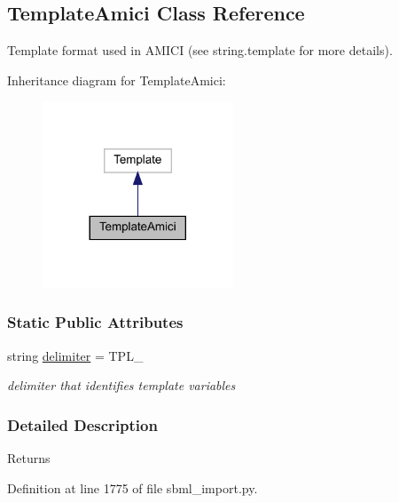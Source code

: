 \hypertarget{classamici_1_1sbml__import_1_1_template_amici}{}\subsection{Template\+Amici Class Reference}
\label{classamici_1_1sbml__import_1_1_template_amici}


Template format used in A\+M\+I\+CI (see string.\+template for more details).  




Inheritance diagram for Template\+Amici\+:
\nopagebreak
\begin{figure}[H]
\begin{center}
\leavevmode
\includegraphics[width=161pt]{classamici_1_1sbml__import_1_1_template_amici__inherit__graph}
\end{center}
\end{figure}
\subsubsection*{Static Public Attributes}
\begin{DoxyCompactItemize}
\item 
\mbox{\label{classamici_1_1sbml__import_1_1_template_amici_aacf4e58be14eef37272a71c004bc3f58}} 
string \mbox{\hyperlink{classamici_1_1sbml__import_1_1_template_amici_aacf4e58be14eef37272a71c004bc3f58}{delimiter}} = \textquotesingle{}T\+P\+L\+\_\+\textquotesingle{}
\begin{DoxyCompactList}\small\item\em delimiter that identifies template variables \end{DoxyCompactList}\end{DoxyCompactItemize}


\subsubsection{Detailed Description}
\begin{DoxyReturn}{Returns}

\end{DoxyReturn}


Definition at line 1775 of file sbml\+\_\+import.\+py.

